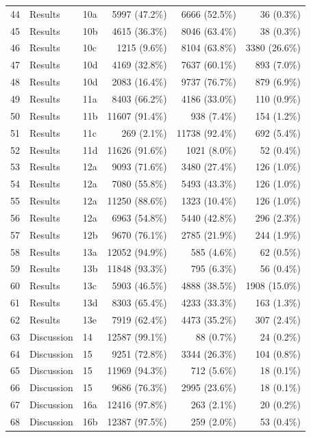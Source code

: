 \begin{longtable}{@{}rllrrr@{}}
44 & Results & 10a & 5997 (47.2\%) & 6666 (52.5\%) & 36 (0.3\%) \\
45 & Results & 10b & 4615 (36.3\%) & 8046 (63.4\%) & 38 (0.3\%) \\
46 & Results & 10c & 1215 (9.6\%) & 8104 (63.8\%) & 3380 (26.6\%) \\
47 & Results & 10d & 4169 (32.8\%) & 7637 (60.1\%) & 893 (7.0\%) \\
48 & Results & 10d & 2083 (16.4\%) & 9737 (76.7\%) & 879 (6.9\%) \\
49 & Results & 11a & 8403 (66.2\%) & 4186 (33.0\%) & 110 (0.9\%) \\
50 & Results & 11b & 11607 (91.4\%) & 938 (7.4\%) & 154 (1.2\%) \\
51 & Results & 11c & 269 (2.1\%) & 11738 (92.4\%) & 692 (5.4\%) \\
52 & Results & 11d & 11626 (91.6\%) & 1021 (8.0\%) & 52 (0.4\%) \\
53 & Results & 12a & 9093 (71.6\%) & 3480 (27.4\%) & 126 (1.0\%) \\
54 & Results & 12a & 7080 (55.8\%) & 5493 (43.3\%) & 126 (1.0\%) \\
55 & Results & 12a & 11250 (88.6\%) & 1323 (10.4\%) & 126 (1.0\%) \\
56 & Results & 12a & 6963 (54.8\%) & 5440 (42.8\%) & 296 (2.3\%) \\
57 & Results & 12b & 9670 (76.1\%) & 2785 (21.9\%) & 244 (1.9\%) \\
58 & Results & 13a & 12052 (94.9\%) & 585 (4.6\%) & 62 (0.5\%) \\
59 & Results & 13b & 11848 (93.3\%) & 795 (6.3\%) & 56 (0.4\%) \\
60 & Results & 13c & 5903 (46.5\%) & 4888 (38.5\%) & 1908 (15.0\%) \\
61 & Results & 13d & 8303 (65.4\%) & 4233 (33.3\%) & 163 (1.3\%) \\
62 & Results & 13e & 7919 (62.4\%) & 4473 (35.2\%) & 307 (2.4\%) \\
63 & Discussion & 14 & 12587 (99.1\%) & 88 (0.7\%) & 24 (0.2\%) \\
64 & Discussion & 15 & 9251 (72.8\%) & 3344 (26.3\%) & 104 (0.8\%) \\
65 & Discussion & 15 & 11969 (94.3\%) & 712 (5.6\%) & 18 (0.1\%) \\
66 & Discussion & 15 & 9686 (76.3\%) & 2995 (23.6\%) & 18 (0.1\%) \\
67 & Discussion & 16a & 12416 (97.8\%) & 263 (2.1\%) & 20 (0.2\%) \\
68 & Discussion & 16b & 12387 (97.5\%) & 259 (2.0\%) & 53 (0.4\%) \\

\end{longtable}
